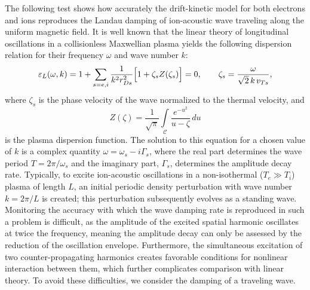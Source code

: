 \documentclass[final,3p]{elsarticle}
\begin{document}
The following test shows how accurately the drift-kinetic model for both electrons and ions reproduces the Landau damping of ion-acoustic wave traveling along the uniform magnetic field. 
It is well known that the linear theory of longitudinal oscillations in a collisionless Maxwellian plasma yields the following dispersion relation for their frequency $\omega$ and wave number $k$:
\begin{equation}\label{ia_disp}
    \varepsilon_L(\omega,k)=1+\sum_{s=e,i}\frac{1}{k^2r_{Ds}^2}
    \Bigl[1+\zeta_s Z(\zeta_s)\Bigr]=0,
    \qquad \zeta_s=\frac{\omega}{\sqrt{2}\,k\,v_{Ts}},
\end{equation}
where $\zeta_s$ is the phase velocity of the wave normalized to the thermal velocity, and
\begin{equation}\label{ia_Z}
    Z(\zeta)=\frac{1}{\sqrt{\pi}}\int\limits_{\mathcal{C}}
    \frac{e^{-u^2}}{u-\zeta}\,du
\end{equation}
is the plasma dispersion function. The solution to this equation for a chosen value of $k$ is a complex quantity $\omega = \omega_s - i\Gamma_s$, where the real part determines the wave period $T = 2\pi/\omega_s$ and the imaginary part, $\Gamma_s$, determines the amplitude decay rate. Typically, to excite ion-acoustic oscillations in a non-isothermal ($T_e \gg T_i$) plasma of length $L$, an initial periodic density perturbation with wave number $k = 2\pi/L$ is created; this perturbation subsequently evolves as a standing wave. Monitoring the accuracy with which the wave damping rate is reproduced in such a problem is difficult, as the amplitude of the excited spatial harmonic oscillates at twice the frequency, meaning the amplitude decay can only be assessed by the reduction of the oscillation envelope. Furthermore, the simultaneous excitation of two counter-propagating harmonics creates favorable conditions for nonlinear interaction between them, which further complicates comparison with linear theory. To avoid these difficulties, we consider the damping of a traveling wave. 
\end{document}
